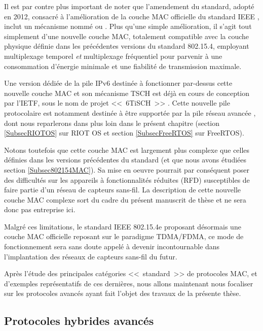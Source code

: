 Il est par contre plus important de noter que l'amendement 
du standard, adopté en 2012, consacré à l'amélioration de la couche MAC
officielle du standard IEEE \cite{IEEE802154e-2012}, inclut un mécanisme
nommé  ou . Plus qu'une
simple amélioration, il s'agit tout simplement d'une nouvelle couche MAC,
totalement compatible avec la couche physique définie dans les précédentes
versions du standard 802.15.4, employant multiplexage temporel \emph{et}
multiplexage fréquentiel pour parvenir à une consommation d'énergie
minimale et une fiabilité de transmission maximale.

Une version dédiée de la pile IPv6 destinée à fonctionner par-dessus cette
nouvelle couche MAC et son mécanisme TSCH est déjà en cours de conception
par l'IETF, sous le nom de projet <<~6TiSCH~>> \cite{6TiSCH}. Cette nouvelle
pile protocolaire est notamment destinée à être supportée par la pile
réseau avancée  \cite{OpenWSN}, dont nous reparlerons
dans plus loin dans le présent chapitre (section \vref{SubsecRIOTOS}
sur RIOT OS et section \vref{SubsecFreeRTOS} sur FreeRTOS).

Notons toutefois que cette couche MAC est largement plus complexe que celles
définies dans les versions précédentes du standard (et que nous avons
étudiées section \vref{Subsec802154MAC}). Sa mise en oeuvre pourrait
par conséquent poser des difficultés sur les appareils à fonctionnalités
réduites (RFD) susceptibles de faire partie d'un réseau de capteurs sans-fil.
La description de cette nouvelle couche MAC complexe sort du cadre du
présent manuscrit de thèse et ne sera donc pas entreprise ici.

Malgré ces limitations, le standard IEEE 802.15.4e proposant désormais une
couche MAC officielle reposant sur le paradigme TDMA/FDMA, ce mode de
fonctionnement sera sans doute appelé à devenir incontournable dans
l'implantation des réseaux de capteurs sans-fil du futur.

\bigskip

Après l'étude des principales catégories <<~standard~>> de protocoles MAC,
et d'exemples représentatifs de ces dernières, nous allons maintenant nous
focaliser sur les protocoles avancés ayant fait l'objet des travaux de
la présente thèse.


\subsection{Protocoles hybrides avancés}
\label{SubsecProtoMACavances}

